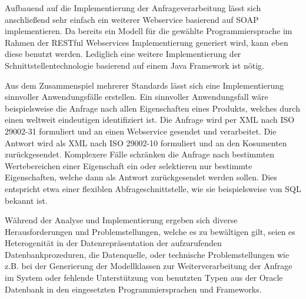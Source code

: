 Aufbauend auf die Implementierung der Anfrageverarbeitung lässt sich anschließend sehr einfach ein weiterer \gls{Webservice} basierend auf \gls{SOAP} implementieren. Da bereits ein Modell für die gewählte Programmiersprache im Rahmen der \gls{REST}ful \glspl{Webservice} Implementierung generiert wird, kann eben diese benutzt werden. Lediglich eine weitere Implementierung der Schnittstellentechnologie basierend auf einem Java Framework ist nötig.  

Aus dem Zusammenspiel mehrerer Standards lässt sich eine Implementierung sinnvoller Anwendungsfälle erstellen. 
Ein sinnvoller Anwendungsfall wäre beispielsweise die Anfrage nach allen Eigenschaften eines Produkts, welches durch einen weltweit eindeutigen  identifiziert ist. Die Anfrage wird per XML nach ISO 29002-31 formuliert und an einen \gls{Webservice} gesendet und verarbeitet. Die Antwort wird als XML nach ISO 29002-10 formuliert und an den Kosumenten zurückgesendet. Komplexere Fälle schränken die Anfrage nach bestimmten Wertebereichen einer Eigenschaft ein oder selektieren nur bestimmte Eigenschaften, welche dann als Antwort zurückgesendet werden sollen. Dies entspricht etwa einer flexiblen \gls{Abfrageschnittstelle}, wie sie beispielsweise von SQL bekannt ist.  

Während der Analyse und Implementierung ergeben sich diverse Herausforderungen und Problemstellungen, welche es zu bewältigen gilt, seien es Heterogenität in der Datenrepräsentation der aufzurufenden Datenbankprozeduren, die Datenquelle, oder technische Problemstellungen wie z.B. bei der Generierung der Modellklassen zur Weiterverarbeitung der Anfrage im System oder fehlende Unterstützung von benutzten Typen aus der Oracle Datenbank in den eingesetzten Programmiersprachen und Frameworks.  




